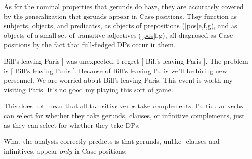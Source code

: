 \documentclass[output=paper,
modfonts
]{LSP/langsci}
\newcommand{\rfa}[2]{(\ref{#1}{#2})}
\begin{document}
As for the nominal properties that gerunds do have, they are accurately covered by the
generalization that gerunds appear in Case positions.  They function as subjects, objects, and
predicates, as objects of prepositions \rfa{pos}{e,f,g}, and as objects of a small set of
transitive adjectives \rfa{pos}{f,g}, all diagnosed as Case positions by the fact that
full-fledged DPs occur in them.
\begin{exe}
\ex\label{pos}
	\ea {[} Bill's leaving Paris ] was unexpected.
	\ex I regret [ Bill's leaving Paris ].
	\ex The problem is [ Bill's leaving Paris ].
	\ex Because of  Bill's leaving Paris we'll be hiring new personnel.
	\ex We are worried about Bill's leaving Paris.
	\ex This event is worth my visiting Paris.
	\ex It's no good my playing this sort of game.\footnotemark 
	\z  
\end{exe}
  This does not mean that all transitive verbs take  complements.
Particular verbs can select for whether they take gerunds, clauses, or infinitive
complements, just as they can select for whether they take DPs:
What the analysis correctly predicts is that gerunds, unlike -clauses and infinitives,
appear \textit{only} in Case positions:
\begin{exe}
\ex\label{nocase}
	\ea
		\begin{xlisti}[iiii.]
		\end{xlisti}
	\ex 
		\begin{xlisti}[iiii.]
		\end{xlisti}
	\ex 
		\begin{xlisti}[iiii.]
		\end{xlisti}
	\z  
\end{exe}
\end{document}
